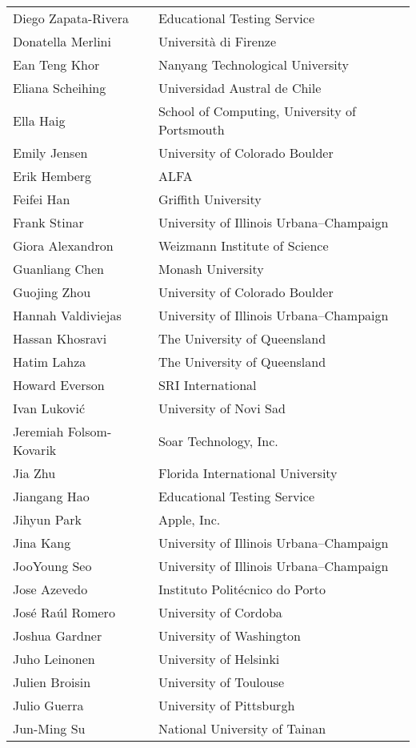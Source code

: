 \documentclass[letterpaper,11pt,oneside]{book} %
\begin{document}
\begin{longtable}[]{@{}
  >{\raggedright\arraybackslash}p{}
  >{\raggedright\arraybackslash}p{}@{}}
Diego Zapata-Rivera & Educational Testing Service \\
Donatella Merlini & Università di Firenze \\
Ean Teng Khor & Nanyang Technological University \\
Eliana Scheihing & Universidad Austral de Chile \\
Ella Haig & School of Computing, University of Portsmouth \\
Emily Jensen & University of Colorado Boulder \\
Erik Hemberg & ALFA \\
Feifei Han & Griffith University \\
Frank Stinar & University of Illinois Urbana--Champaign \\
Giora Alexandron & Weizmann Institute of Science \\
Guanliang Chen & Monash University \\
Guojing Zhou & University of Colorado Boulder \\
Hannah Valdiviejas & University of Illinois Urbana--Champaign \\
Hassan Khosravi & The University of Queensland \\
Hatim Lahza & The University of Queensland \\
Howard Everson & SRI International \\
Ivan Luković & University of Novi Sad \\
Jeremiah Folsom-Kovarik & Soar Technology, Inc. \\
Jia Zhu & Florida International University \\
Jiangang Hao & Educational Testing Service \\
Jihyun Park & Apple, Inc. \\
Jina Kang & University of Illinois Urbana--Champaign \\
JooYoung Seo & University of Illinois Urbana--Champaign \\
Jose Azevedo & Instituto Politécnico do Porto \\
José Raúl Romero & University of Cordoba \\
Joshua Gardner & University of Washington \\
Juho Leinonen & University of Helsinki \\
Julien Broisin & University of Toulouse \\
Julio Guerra & University of Pittsburgh \\
Jun-Ming Su & National University of Tainan \\

\end{longtable}
\end{document}
